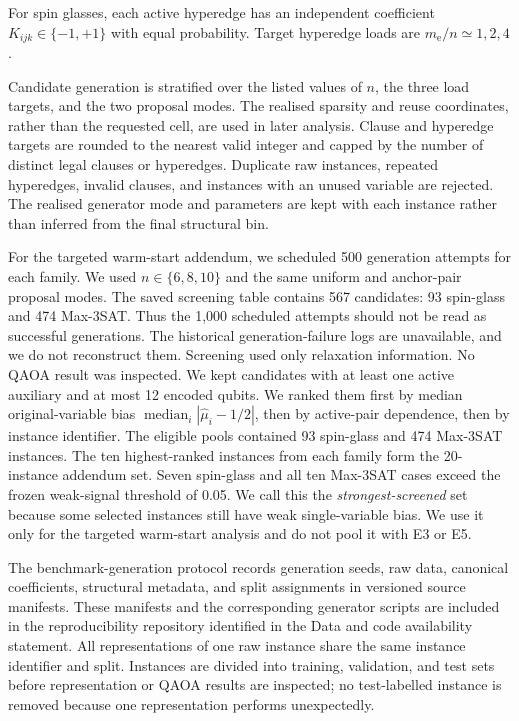 \documentclass[a4paper,onecolumn,11pt,unpublished]{quantumarticle}
\theoremstyle{remark}
\begin{document}
For spin glasses, each active hyperedge has an independent coefficient
$K_{ijk}\in\{-1,+1\}$ with equal probability. Target hyperedge loads are
$m_{\mathrm e}/n\simeq1,2,4$.

Candidate generation is stratified over the listed values of $n$, the three
load targets, and the two proposal modes.  The realised sparsity and reuse
coordinates, rather than the requested cell, are used in later analysis.
Clause and hyperedge targets are rounded to the nearest valid integer and
capped by the number of distinct legal clauses or hyperedges.  Duplicate raw
instances, repeated hyperedges, invalid clauses, and instances with an unused
variable are rejected.  The realised generator mode and parameters are kept
with each instance rather than inferred from the final structural bin.

For the targeted warm-start addendum, we scheduled 500 generation attempts
for each family. We used $n\in\{6,8,10\}$ and the same uniform and
anchor-pair proposal modes. The saved screening table contains 567 candidates:
93 spin-glass and 474 Max-3SAT. Thus the 1,000 scheduled attempts should not
be read as successful generations. The historical generation-failure logs
are unavailable, and we do not reconstruct them.
Screening used only relaxation information. No QAOA result was inspected.
We kept candidates with at least one active auxiliary and at most 12 encoded
qubits. We ranked them first by median original-variable bias
$\operatorname{median}_i|\widehat\mu_i-1/2|$, then by active-pair dependence,
then by instance identifier. The eligible pools contained 93 spin-glass and
474 Max-3SAT instances. The ten highest-ranked instances from each family
form the 20-instance addendum set.
Seven spin-glass and all ten Max-3SAT cases exceed the frozen weak-signal
threshold of 0.05. We call this the \emph{strongest-screened} set because
some selected instances still have weak single-variable bias. We use it only
for the targeted warm-start analysis and do not pool it with E3 or E5.

The benchmark-generation protocol records generation seeds, raw data,
canonical coefficients, structural metadata, and split assignments in
versioned source manifests.  These manifests and the corresponding generator
scripts are included in the reproducibility repository identified in the Data
and code availability statement.  All representations of one raw instance share the same instance
identifier and split.  Instances are divided into training, validation, and
test sets before representation or QAOA results are inspected; no
test-labelled instance is removed because one representation performs
unexpectedly.
\end{document}
